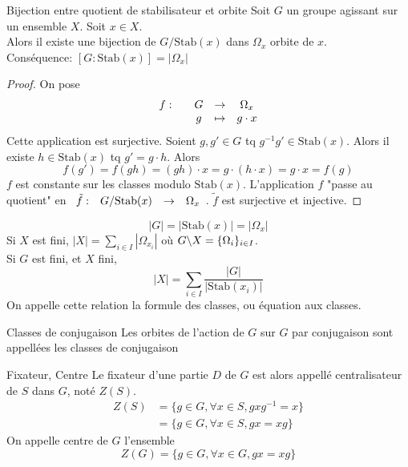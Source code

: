 \documentclass[]{report}
\begin{document}
\begin{prop}{Bijection entre quotient de stabilisateur et orbite}{}
    Soit $G$ un groupe agissant sur un ensemble $X$. Soit $x\in X$.\\
    Alors il existe une bijection de $G/\text{Stab}(x)$ dans $\Omega_x$ orbite de $x$.\\
    Conséquence: $[G:\text{Stab}(x)]=\left|\Omega_x\right|$
\end{prop}

\begin{proof}{}{}
    On pose
    \[\begin{array}{ccccc} f : & & G & \to & \Omega_x \\ & & g & \mapsto & g\cdot x \end{array}\]
    Cette application est surjective. Soient $g,g'\in G$ tq $g^{-1}g'\in \text{Stab}(x)$. Alors il existe $h\in \text{Stab}(x)$ tq $g'=g\cdot h$. Alors
    \[f(g')=f(gh)=(gh)\cdot x=g\cdot(h\cdot x)=g\cdot x=f(g)\]
    $f$ est constante sur les classes modulo $\text{Stab}(x)$. L'application $f$ "passe au quotient" en $\begin{array}{ccccc} \tilde{f} : & G/\text{Stab}(x) & \to & \Omega_x \end{array}$. $\tilde{f}$ est surjective et injective.
\end{proof}

\begin{cor}{}{}
    \[\left|G\right|=\left|\text{Stab}(x)\right|=\left|\Omega_x\right|\]
    Si $X$ est fini, $\left|X\right|=\sum_{i\in I}\left|\Omega_{x_i}\right|$ où $G\backslash X=\{\Omega_i\}_{i\in I}$.\\
    Si $G$ est fini, et $X$ fini,
    \[\left|X\right|=\sum_{i\in I}\frac{\left|G\right|}{\left|\text{Stab}(x_i)\right|}\]
    On appelle cette relation la formule des classes, ou équation aux classes.
\end{cor}

\begin{df}{Classes de conjugaison}{}
    Les orbites de l'action de $G$ sur $G$ par conjugaison sont appellées les classes de conjugaison
\end{df}

\begin{df}{Fixateur, Centre}{}
    Le fixateur d'une partie $D$ de $G$ est alors appellé centralisateur de $S$ dans $G$, noté $Z(S)$.
    \begin{align*}
        Z(S)&=\{g\in G,\forall x\in S,gxg^{-1}=x\}\\
        &=\{g\in G,\forall x\in S,gx=xg\}
    \end{align*}
    On appelle centre de $G$ l'ensemble
    \[Z(G)=\{g\in G,\forall x\in G,gx=xg\}\]
\end{df}
\end{document}
